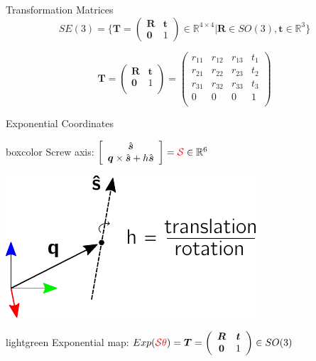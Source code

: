 \documentclass[14pt]{beamer}
\begin{document}
\begin{frame}{Transformation Matrices}
\[
SE(3) = \biggl\{ \boldsymbol{T} = \left(
\begin{array}{cc}
\boldsymbol{R} & \boldsymbol{t}\\
\boldsymbol{0} & 1
\end{array}
\right) \in \mathbb{R}^{4 \times 4}
| \boldsymbol{R} \in SO(3), \boldsymbol{t} \in \mathbb{R}^3 \biggr\}
\]

\[
\boldsymbol T =
\left( \begin{array}{cc}
    \boldsymbol R & \boldsymbol t\\
    \boldsymbol 0 & 1\\
\end{array} \right)
=
\left(
\begin{matrix}
r_{11} & r_{12} & r_{13} & t_1\\
r_{21} & r_{22} & r_{23} & t_2\\
r_{31} & r_{32} & r_{33} & t_3\\
0 & 0 & 0 & 1\\
\end{matrix}
\right)
\]
\end{frame}

\begin{frame}{Exponential Coordinates}
\begin{beamercolorbox}[wd=\textwidth,sep=1em]{boxcolor}
Screw axis: $\left[ \begin{array}{c}\hat{\boldsymbol{s}} \\ \boldsymbol{q} \times \hat{\boldsymbol{s}} + h \hat{\boldsymbol{s}}\end{array} \right] = \textcolor{red}{\mathcal{S}} \in \mathbb{R}^6$
\end{beamercolorbox}

\vfill

\hfill\includegraphics{images/screw_axis}

\vfill

\begin{beamercolorbox}[wd=\textwidth,sep=1em]{lightgreen}
Exponential map: $Exp(\textcolor{red}{\mathcal{S}\theta}) = \boldsymbol{T} =
\left( \begin{array}{cc}
\boldsymbol R & \boldsymbol t\\
\boldsymbol 0 & 1\\
\end{array} \right)
\in SO(3)$
\end{beamercolorbox}
\end{frame}
\end{document}
